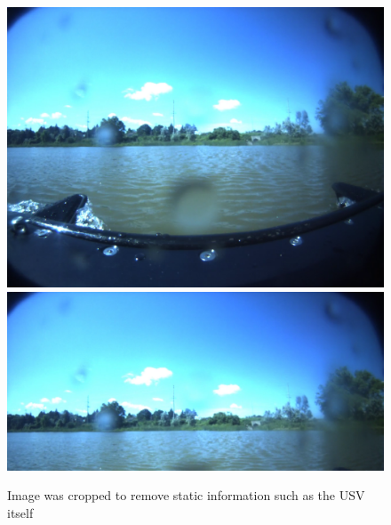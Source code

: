 \documentclass[10pt,twocolumn,letterpaper]{article}
\begin{document}
\begin{figure}[t]	
\begin{center}
  \includegraphics[width=1.0\linewidth]{CL_0025.png}
  \includegraphics[width=1.0\linewidth]{CL_0025C.png}
\end{center}
   \caption{Image was cropped to remove static information such as the USV itself}
\label{fig:crop}
\end{figure}



{\small


}
\end{document}
